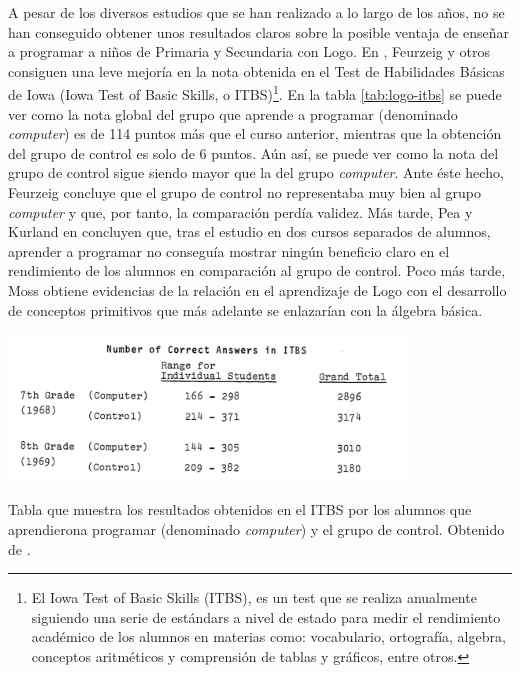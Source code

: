 A pesar de los diversos estudios que se han realizado a lo largo de los años, no se han conseguido obtener unos resultados claros sobre la posible ventaja de enseñar a programar a niños de Primaria y Secundaria con Logo. En \cite{feurzeig1969programming}, Feurzeig y otros consiguen una leve mejoría en la nota obtenida en el Test de Habilidades Básicas de Iowa (Iowa Test of Basic Skills, o ITBS)\footnote{El Iowa Test of Basic Skills (ITBS), es un test que se realiza anualmente siguiendo una serie de estándars a nivel de estado para medir el rendimiento académico de los alumnos en materias como: vocabulario, ortografía, algebra, conceptos aritméticos y comprensión de tablas y gráficos, entre otros.}. En la tabla \ref{tab:logo-itbs} se puede ver como la nota global del grupo que aprende a programar (denominado \emph{computer}) es de 114 puntos más que el curso anterior, mientras que la obtención del grupo de control es solo de 6 puntos. Aún así, se puede ver como la nota del grupo de control sigue siendo mayor que la del grupo \emph{computer}. Ante éste hecho, Feurzeig concluye que el grupo de control no representaba muy bien al grupo \emph{computer} y que, por tanto, la comparación perdía validez.
Más tarde, Pea y Kurland en \cite{pea1984logo} concluyen que, tras el estudio en dos cursos separados de alumnos, aprender a programar no conseguía mostrar ningún beneficio claro en el rendimiento de los alumnos en comparación al grupo de control.
Poco más tarde, Moss \cite{moss1985creating} obtiene evidencias de la relación en el aprendizaje de Logo con el desarrollo de conceptos primitivos que más adelante se enlazarían con la álgebra básica.


\begin{table}[!ht]
	\begin{centering}
		\includegraphics[width=0.8\textwidth]{images/logo-itbs.png}
			\caption{Tabla que muestra los resultados obtenidos en el ITBS por los alumnos que aprendierona programar (denominado \emph{computer}) y el grupo de control. Obtenido de \cite[p.251]{feurzeig1969programming}.}
				\label{tab:logo-itbs}
	\end{centering}
\end{table}


